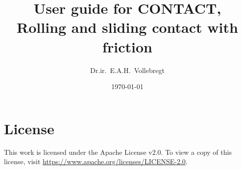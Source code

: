 \documentclass[12pt]{report}
\title{User guide for CONTACT,\\
       Rolling and sliding contact with friction}
\author{Dr.ir.\ E.A.H.\ Vollebregt}
\date{\today}
\renewcommand{\magenta}[1]{}
\begin{document}
\pagestyle{vtrep}
\maketitle


\magenta{
\begin{vtlogsheet}
\vtlogentry{1.122}{EV}{19-07-2021}{Version for release v21.1}{}
\vtlogentry{1.135}{EV}{01-08-2022}{Version for release v22.1}{}
\vtlogentry{1.136}{EV}{08-08-2022}{Added slcs-file for switches and crossings}{}
\vtlogentry{1.137}{EV}{13-08-2022}{Added turning of contact reference angle}{}
\vtlogentry{1.138}{EV}{27-10-2022}{Added xrange and xysteps to plot3d}{}
\vtlogentry{1.139}{EV}{17-11-2022}{Extended slcs-file for parts-information}{}
\vtlogentry{1.140}{EV}{15-12-2022}{Version for release v22.2}{}
\vtlogentry{1.141}{EV}{02-03-2023}{Added {\tt S\_METHOD} for approximating
        spline}{}
\vtlogentry{1.142}{EV}{20-03-2023}{Correction format {\tt slcs}-file}{}
\vtlogentry{1.143}{EV}{20-03-2023}{Added {\tt NPOT\_MAX}}{}
\vtlogentry{1.144}{EV}{23-03-2023}{Added ${\tt D}=6,8,9$}{}
\vtlogentry{1.145}{EV}{14-04-2023}{Version for release v23.1}{}
\vtlogentry{1.146}{EV}{10-05-2023}{Added massless rail deflection ${\tt 
        F}_1=3$}{}
\vtlogentry{1.147}{EV}{19-06-2023}{Changed cntc\_getprofilevalues}{}
\vtlogentry{1.148}{EV}{31-07-2023}{Added configuration of debug outputs}{}
\vtfilelocation{$<$svn-contc$>$/contact/doc}
\end{vtlogsheet}
}


\tableofcontents

\clearpage
\chapter*{License}

This work is licensed under the Apache License v2.0. To view a copy of this
license, visit
\href{https://www.apache.org/licenses/LICENSE-2.0}{https://\-www.apache.org/licenses/LICENSE-2.0}.

\end{document}
